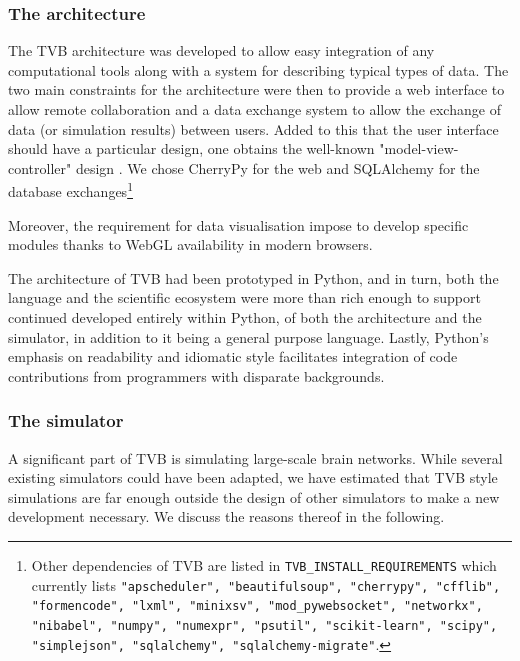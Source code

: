 \subsubsection{The architecture}


The TVB architecture was developed to allow easy integration of any
computational tools along with a system for describing typical types of data.
The two main constraints for the architecture were then to provide a web
interface to allow remote collaboration and a data exchange system to allow the
exchange of data (or simulation results) between users. Added to this that
the user interface should have a particular design, one obtains the well-known
"model-view-controller" design .  We chose
\textsf{CherryPy} for the web  and \textsf{SQLAlchemy} for the database
exchanges\footnote{Other dependencies of TVB are listed in
    \texttt{TVB\_INSTALL\_REQUIREMENTS} which currently lists
    \texttt{"apscheduler", "beautifulsoup", "cherrypy", "cfflib", "formencode",
        "lxml", "minixsv", "mod\_pywebsocket", "networkx", "nibabel", "numpy",
        "numexpr", "psutil", "scikit-learn", "scipy", "simplejson",
        "sqlalchemy", "sqlalchemy-migrate"}.}

Moreover, the requirement for data visualisation impose to develop specific
modules thanks to WebGL availability in modern browsers.

The architecture of TVB had been prototyped in Python, and in turn, both the
language and the scientific ecosystem were more than rich enough to support
continued developed entirely within Python, of both the architecture and the
simulator, in addition to it being a general purpose language. Lastly, Python's
emphasis on readability and idiomatic style facilitates integration of 
code contributions from programmers with disparate backgrounds.


\subsubsection{The simulator}

A significant part of TVB is simulating large-scale brain networks. While
several existing simulators could have been adapted, we have estimated that
TVB style simulations are far enough outside the design of other simulators to
make a new development necessary. We discuss the reasons thereof in the following. 

